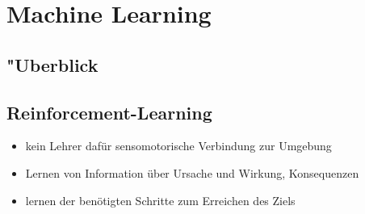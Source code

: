 \section{Machine Learning}
\subsection{"Uberblick}
\subsection{Reinforcement-Learning}
\begin{itemize}
    \item kein Lehrer dafür sensomotorische Verbindung zur Umgebung
    \item Lernen von Information über Ursache und Wirkung, Konsequenzen
    \item lernen der benötigten Schritte zum Erreichen des Ziels
\end{itemize}

